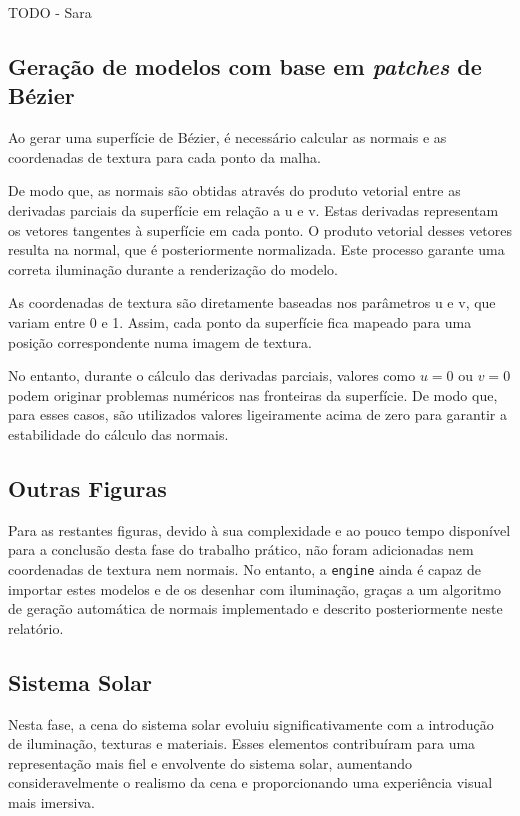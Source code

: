 \documentclass[12pt, a4paper]{article}
\begin{document}
{\color{red} TODO - Sara}

\subsection{Geração de modelos com base em \emph{patches} de Bézier}

Ao gerar uma superfície de Bézier, é necessário calcular as normais e as coordenadas de textura para
cada ponto da malha.

De modo que, as normais são obtidas através do produto vetorial entre as derivadas
parciais da superfície em relação a u e v. Estas derivadas representam os vetores tangentes à
superfície em cada ponto. O produto vetorial desses vetores resulta na normal, que é posteriormente
normalizada. Este processo garante uma correta iluminação durante a renderização do modelo.

As coordenadas de textura são diretamente baseadas nos parâmetros u e v, que variam entre 0 e 1.
Assim, cada ponto da superfície fica mapeado para uma posição correspondente numa imagem de textura.

No entanto, durante o cálculo das derivadas parciais, valores como $u = 0$ ou $v = 0$ podem
originar problemas numéricos nas fronteiras da superfície. De modo que, para esses casos, são
utilizados valores ligeiramente acima de zero para garantir a estabilidade do cálculo das normais.

\subsection{Outras Figuras}

Para as restantes figuras, devido à sua complexidade e ao pouco tempo disponível para a conclusão
desta fase do trabalho prático, não foram adicionadas nem coordenadas de textura nem normais. No
entanto, a \texttt{engine} ainda é capaz de importar estes modelos e de os desenhar com iluminação,
graças a um algoritmo de geração automática de normais implementado e descrito posteriormente neste
relatório.

\subsection{Sistema Solar}

Nesta fase, a cena do sistema solar evoluiu significativamente com a introdução de iluminação,
texturas e materiais. Esses elementos contribuíram para uma representação mais fiel e
envolvente do sistema solar, aumentando consideravelmente o realismo da cena e proporcionando
uma experiência visual mais imersiva.
\end{document}
